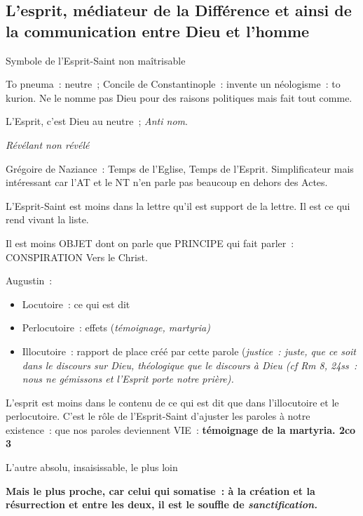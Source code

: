 \hypertarget{lesprit-muxe9diateur-de-la-diffuxe9rence-et-ainsi-de-la-communication-entre-dieu-et-lhomme}{%
\subsection{L'esprit, médiateur de la Différence et ainsi de la
communication entre Dieu et
l'homme}\label{lesprit-muxe9diateur-de-la-diffuxe9rence-et-ainsi-de-la-communication-entre-dieu-et-lhomme}}

Symbole de l'Esprit-Saint non maîtrisable

To pneuma~: neutre~; Concile de Constantinople~: invente un néologisme~:
to kurion. Ne le nomme pas Dieu pour des raisons politiques mais fait
tout comme.

L'Esprit, c'est Dieu au neutre~; \emph{Anti nom}.

\emph{Révélant non révélé}

Grégoire de Naziance~: Temps de l'Eglise, Temps de l'Esprit.
Simplificateur mais intéressant car l'AT et le NT n'en parle pas
beaucoup en dehors des Actes.

L'Esprit-Saint est moins dans la lettre qu'il est support de la lettre.
Il est ce qui rend vivant la liste.

Il est moins OBJET dont on parle que PRINCIPE qui fait parler~:
CONSPIRATION Vers le Christ.

Augustin~:~

\begin{itemize}
\item
  Locutoire~: ce qui est dit
\item
  Perlocutoire~: effets (\emph{témoignage, martyria)}
\item
  Illocutoire~: rapport de place créé par cette parole (\emph{justice~:
  juste, que ce soit dans le discours sur Dieu, théologique que le
  discours à Dieu (cf Rm 8, 24ss~: nous ne gémissons et l'Esprit porte
  notre prière).}
\end{itemize}

L'esprit est moins dans le contenu de ce qui est dit que dans
l'illocutoire et le perlocutoire. C'est le rôle de l'Esprit-Saint
d'ajuster les paroles à notre existence~: que nos paroles deviennent
VIE~: \textbf{témoignage de la martyria. 2co 3}

L'autre absolu, insaisissable, le plus loin

\textbf{Mais le plus proche, car celui qui somatise~: à la création et
la résurrection et entre les deux, il est le souffle de
\emph{sanctification.}}

